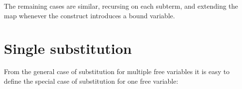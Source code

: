 The remaining cases are similar, recursing on each subterm, and
extending the map whenever the construct introduces a bound variable.

\hypertarget{single-substitution}{%
\section{Single substitution}\label{single-substitution}}

From the general case of substitution for multiple free variables it is
easy to define the special case of substitution for one free variable:

\begin{fence}
\begin{code}%
\>[0]\AgdaOperator{\AgdaFunction{\AgdaUnderscore{}[\AgdaUnderscore{}]}}\AgdaSpace{}%
\AgdaSymbol{:}\AgdaSpace{}%
\AgdaSpace{}%
\AgdaSymbol{\{}\AgdaSpace{}%
\AgdaSpace{}%
\AgdaSymbol{\}}\<%
\\
\>[0][@{}l@{\AgdaIndent{0}}]%
\>[2]\AgdaSpace{}%
\AgdaSpace{}%
\AgdaOperator{\AgdaInductiveConstructor{,}}\AgdaSpace{}%
\AgdaSpace{}%
\AgdaSpace{}%
\<%
\\
%
\>[2]%
\>[889I]\AgdaSpace{}%
\AgdaSpace{}%
\<%
\\
\>[.][@{}l@{}]\<[889I]%
\>[4]\AgdaComment{---------}\<%
\\
%
\>[2]\AgdaSpace{}%
\AgdaSpace{}%
\AgdaSpace{}%
\<%
\\
\>[0]\AgdaOperator{\AgdaFunction{\AgdaUnderscore{}[\AgdaUnderscore{}]}}\AgdaSpace{}%
\AgdaSymbol{\{}\AgdaSymbol{\}}\AgdaSpace{}%
\AgdaSymbol{\{}\AgdaSymbol{\}}\AgdaSpace{}%
\AgdaSymbol{\{}\AgdaSymbol{\}}\AgdaSpace{}%
\AgdaSpace{}%
\AgdaSpace{}%
\AgdaSymbol{=}%
\>[24]\AgdaSpace{}%
\AgdaSymbol{\{}\AgdaSpace{}%
\AgdaOperator{\AgdaInductiveConstructor{,}}\AgdaSpace{}%
\AgdaSymbol{\}}\AgdaSpace{}%
\AgdaSymbol{\{}\AgdaSymbol{\}}\AgdaSpace{}%
\AgdaSpace{}%
\AgdaSymbol{\{}\AgdaSymbol{\}}\AgdaSpace{}%
\<%
\\
\>[0][@{}l@{\AgdaIndent{0}}]%
\>[2]\<%
\\
%
\>[2]\AgdaSpace{}%

\end{code}
\end{fence}
